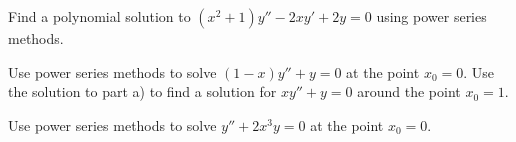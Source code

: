 \begin{exercise}
Find a polynomial solution to $(x^2+1) y''-2xy'+2y = 0$ using
power series methods.
\end{exercise}

\begin{exercise}
\leavevmode
\begin{tasks}
\task Use power series methods to solve $(1-x)y''+y = 0$ at the point $x_0 = 0$.
\task Use the solution to part a) to find a solution
for $xy''+y=0$ around the point $x_0=1$.
\end{tasks}
\end{exercise}

\setcounter{exercise}{100}

\begin{exercise}
Use power series methods to solve $y'' + 2 x^3 y = 0$ at the point $x_0 =
0$.
\end{exercise}

